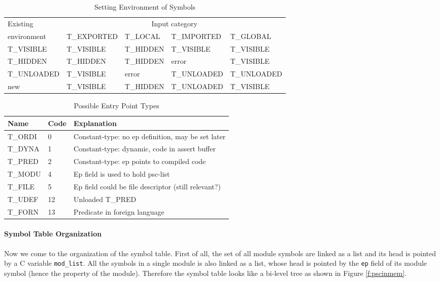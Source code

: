 \documentclass[11pt]{article}
\begin{document}
\begin{table}\centering
\begin{tabular}{l|llll}
\hline
Existing     & \multicolumn{4}{c}{Input category}	\\ \cline{2-5}
environment  &  T\_EXPORTED &  T\_LOCAL & T\_IMPORTED & T\_GLOBAL \\
\hline
T\_VISIBLE   & T\_VISIBLE & T\_HIDDEN & T\_VISIBLE  & T\_VISIBLE \\
T\_HIDDEN    & T\_HIDDEN  & T\_HIDDEN & error       & T\_VISIBLE \\
T\_UNLOADED  & T\_VISIBLE & error     & T\_UNLOADED & T\_UNLOADED\\
new          & T\_VISIBLE & T\_HIDDEN & T\_UNLOADED & T\_VISIBLE \\
\hline
\end{tabular}
\caption{Setting Environment of Symbols}
\label{t:envset}
\end{table}
%
\begin{table}\centering
\begin{tabular}{l|l|l}
\hline
Name & Code	& Explanation				\\
\hline

T\_ORDI  & 0	& Constant-type: no ep definition, may be set later  \\
T\_DYNA	& 1	& Constant-type: dynamic, code in assert buffer  \\
T\_PRED  & 2	& Constant-type: ep points to compiled code  \\
T\_MODU  & 4	& Ep field is used to hold psc-list  \\
T\_FILE  & 5	& Ep field could be file descriptor (still relevant?)  \\
T\_UDEF & 12	& Unloaded T\_PRED  \\
T\_FORN & 13	& Predicate in foreign language  \\
\hline
\end{tabular}
\caption{Possible Entry Point Types}
\label{t:ep}
\end{table}
%


\paragraph*{Symbol Table Organization}
Now we come to the organization of the symbol table.  First of all,
the set of all module symbols are linked as a list and its head is
pointed by a C variable {\tt mod\_list}. All the symbols in a single
module is also linked as a list, whose head is pointed by the {\tt ep}
field of its module symbol (hence the property of the module).
Therefore the symbol table looks like a bi-level tree as shown in
Figure \ref{f:pscinmem}.
\end{document}
